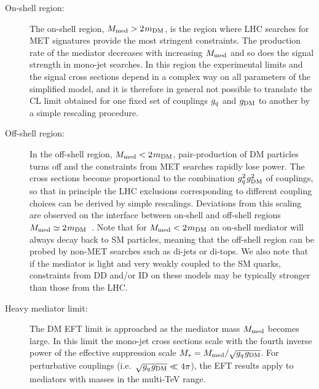 \begin{description}

\item[On-shell region:] The on-shell region, $M_{\rm{med}} > 2  \hspace{0.25mm}  m_{\rm{DM}}$, is the region where  LHC searches for MET signatures provide the most stringent constraints. The production rate of the mediator decreases with increasing $M_{\rm{med}}$ and so does the signal strength in mono-jet searches. In this region the  experimental limits and the signal cross sections depend in a complex way on all parameters of the simplified model, and it is therefore in general not possible to translate the CL limit obtained for one fixed set of couplings $g_q$ and $g_{\rm{DM}}$ to another by a simple rescaling procedure. 
	
 \item[Off-shell region:] In the off-shell region, $M_{\rm{med}} < 2 \hspace{0.25mm} m_{\rm{DM}}$, pair-production of DM particles turns off and the constraints from MET searches rapidly lose power. The cross sections become proportional to the combination $g_q^2  \hspace{0.25mm} g_{\rm{DM}}^2$ of couplings, so that in principle the LHC exclusions corresponding to different coupling choices can be derived by simple rescalings.  Deviations from this scaling are observed on the interface between on-shell and off-shell regions $M_{\rm{med}} \simeq 2 \hspace{0.25mm} m_{\rm{DM}}$~\cite{Jacques:2015zha}. 
Note that for $M_{\rm{med}} < 2 \hspace{0.25mm} m_{\rm{DM}}$ an on-shell mediator will always decay back to SM particles, meaning that the off-shell region can be probed by non-MET searches such as di-jets or di-tops. We also note that if the mediator is light and very weakly coupled to the SM quarks, constraints from DD and/or ID on these models may be typically stronger than those from the LHC.
 
  
\item[Heavy mediator limit:] The DM EFT limit is approached as the mediator mass $M_{\rm{med}}$ becomes large. In this limit the mono-jet cross sections scale with the fourth inverse power of the effective suppression scale $M_\ast =  M_{\rm{med}}/\sqrt{g_q \hspace{0.25mm} g_{\rm{DM}}}$. For perturbative couplings (i.e.~$\sqrt{g_q  \hspace{0.25mm}  g_{\rm{DM}}} \ll 4 \pi$), the EFT results apply to mediators with masses in the multi-TeV range. 

\end{description}

